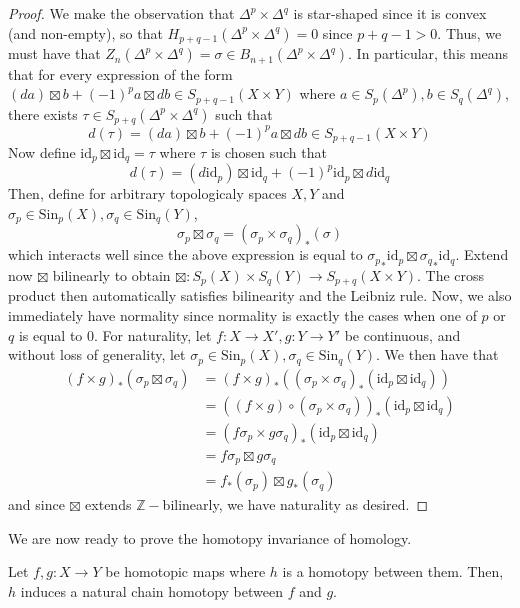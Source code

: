 \documentclass[12pt,reqno]{amsart}
\numberwithin{theorem}{section}
\theoremstyle{definition}
\theoremstyle{remark}
\numberwithin{equation}{section}
\newcommand{\Z}{\mathbb Z}
\theoremstyle{definition}
\newcommand{\id}{\mathrm{id}}
\newcommand{\Sin}{\mathrm{Sin}}
\begin{document}
\begin{proof}
We make the observation that $\Delta^p\times \Delta^q$ is star-shaped since it is convex (and non-empty), so that $H_{p+q-1}(\Delta^p\times \Delta^q) = 0$ since $p+q-1 > 0$. Thus, we must have that $Z_n (\Delta^p\times \Delta^q)=\sigma \in B_{n+1}(\Delta^p\times \Delta^q)$. In particular, this means that for every expression of the form $(da)\boxtimes b +(-1)^pa\boxtimes db \in S_{p+q-1}(X\times Y)$ where $a \in S_p(\Delta^p),b \in S_q(\Delta^q)$, there exists $\tau \in S_{p+q}(\Delta^p \times \Delta^q)$ such that
$$d (\tau) = (da)\boxtimes b +(-1)^pa\boxtimes db \in S_{p+q-1}(X\times Y)$$
Now define $\id_p \boxtimes \id_q = \tau$ where $\tau$ is chosen such that $$d(\tau) = (d\id_p)\boxtimes \id_q +(-1)^p\id_p\boxtimes d\id_q$$
Then, define for arbitrary topologicaly spaces $X,Y$ and $\sigma_p \in \Sin_p(X),\sigma_q \in \Sin_q(Y)$,
$$\sigma_p \boxtimes \sigma_q =(\sigma_p \times \sigma_q)_*(\sigma)$$
which interacts well since the above expression is equal to ${\sigma_p}_*\id_p \boxtimes {\sigma_q}_*\id_q$. Extend now $\boxtimes$ bilinearly to obtain $\boxtimes : S_p(X)\times S_q(Y) \rightarrow S_{p+q}(X\times Y)$. The cross product then automatically satisfies bilinearity and the Leibniz rule. Now, we also immediately have normality since normality is exactly the cases when one of $p$ or $q$ is equal to 0. For naturality, let $f:X\rightarrow X',g:Y\rightarrow Y'$ be continuous, and without loss of generality, let $\sigma_p \in \Sin_p(X),\sigma_q \in \Sin_q(Y)$. We then have that 
\begin{align*}
   (f\times g)_*(\sigma_p\boxtimes \sigma_q) &= (f\times g)_*((\sigma_p\times \sigma_q)_* (\id_p\boxtimes \id_q)) \\
   &= ((f\times g)\circ (\sigma_p\times \sigma_q))_*(\id_p\boxtimes \id_q) \\
   &= (f\sigma_p\times g\sigma_q)_* (\id_p\boxtimes \id_q) \\
   &= f\sigma_p \boxtimes g\sigma_q \\
   &= f_*(\sigma_p)\boxtimes g_*(\sigma_q)
\end{align*}
and since $\boxtimes$ extends $\Z-$bilinearly, we have naturality as desired.
\end{proof}
We are now ready to prove the homotopy invariance of homology.
\begin{theorem}
    Let $f,g:X\rightarrow Y$ be homotopic maps where $h$ is a homotopy between them. Then, $h$ induces a natural chain homotopy between $f$ and $g$.
\end{theorem}
\end{document}
